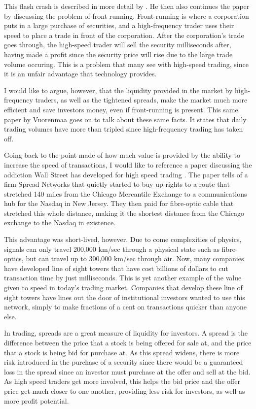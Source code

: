 \documentclass[11pt,]{article}
\begin{document}
This flash crash is described in more detail by
\citet{vuorenmaa2013good}. He then also continues the paper by
discussing the problem of front-running. Front-running is where a
corporation puts in a large purchase of securities, and a high-frequency
trader uses their speed to place a trade in front of the corporation.
After the corporation's trade goes through, the high-speed trader will
sell the security milliseconds after, having made a profit since the
security price will rise due to the large trade volume occuring. This is
a problem that many see with high-speed trading, since it is an unfair
advantage that technology provides.

I would like to argue, however, that the liquidity provided in the
market by high-frequency traders, as well as the tightened spreads, make
the market much more efficient and save investors money, even if
front-running is present. This same paper by Vuorenmaa goes on to talk
about these same facts. It states that daily trading volumes have more
than tripled since high-frequency trading has taken off.

Going back to the point made of how much value is provided by the
ability to increase the speed of transactions, I would like to reference
a paper discussing the addiction Wall Street has developed for high
speed trading \citet{adler2012raging}. The paper tells of a firm Spread
Networks that quietly started to buy up rights to a route that stretched
140 miles from the Chicago Mercantile Exchange to a communications hub
for the Nasdaq in New Jersey. They then paid for fibre-optic cable that
stretched this whole distance, making it the shortest distance from the
Chicago exchange to the Nasdaq in existence.

This advantage was short-lived, however. Due to come complexities of
physics, signals can only travel 200,000 km/sec through a physical state
such as fibre-optics, but can travel up to 300,000 km/sec through air.
Now, many companies have developed line of sight towers that have cost
billions of dollars to cut transaction time by just milliseconds. This
is yet another example of the value given to speed in today's trading
market. Companies that develop these line of sight towers have lines out
the door of institutional investors wanted to use this network, simply
to make fractions of a cent on transactions quicker than anyone else.

In trading, spreads are a great measure of liquidity for investors. A
spread is the difference between the price that a stock is being offered
for sale at, and the price that a stock is being bid for purchase at. As
this spread widens, there is more risk introduced in the purchase of a
security since there would be a guaranteed loss in the spread since an
investor must purchase at the offer and sell at the bid. As high speed
traders get more involved, this helps the bid price and the offer price
get much closer to one another, providing less risk for investors, as
well as more profit potential.
\end{document}
